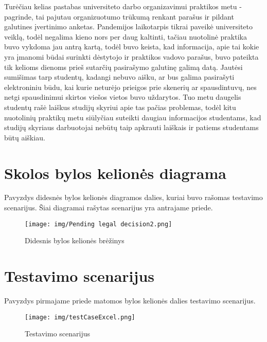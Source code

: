 \documentclass{VUMIFPSkursinis}
\begin{document}
Turėčiau kelias pastabas universiteto darbo organizavimui praktikos metu - pagrinde, tai pajutau organizuotumo trūkumą renkant parašus ir pildant galutines įvertinimo anketas. Pandemijos laikotarpis tikrai paveikė universiteto veiklą, todėl negalima kieno nors per daug kaltinti, tačiau nuotolinė praktika buvo vykdoma jau antrą kartą, todėl buvo keista, kad informacija, apie tai kokie yra įmanomi būdai surinkti dėstytojo ir praktikos vadovo parašus, buvo pateikta tik kelioms dienoms prieš sutarčių pasirašymo galutinę galimą datą. Jautėsi sumišimas tarp studentų, kadangi nebuvo aišku, ar bus galima pasirašyti elektroniniu būdu, kai kurie neturėjo prieigos prie skenerių ar spausdintuvų, nes netgi spausdinimui skirtos viešos vietos buvo uždarytos. Tuo metu daugelis studentų rašė laiškus studijų skyriui apie tas pačias problemas, todėl kitu nuotolinių praktikų metu siūlyčiau suteikti daugiau informacijos studentams, kad studijų skyriaus darbuotojai nebūtų taip apkrauti laiškais ir patiems studentams būtų aiškiau.

\printbibliography[heading=bibintoc]

\appendix
\section{Skolos bylos kelionės diagrama}
Pavyzdys didesnės bylos kelionės diagramos dalies, kuriai buvo rašomas testavimo scenarijus. Šiai diagramai rašytas scenarijus yra antrajame priede.

\begin{figure}[H]
    \centering
    \texttt{[image: img/Pending legal decision2.png]}
    \caption{Didesnis bylos kelionės brėžinys}
    \label{img:brezinysDid}
\end{figure}

\section{Testavimo scenarijus}
Pavyzdys pirmajame priede matomos bylos kelionės dalies testavimo scenarijus.

\begin{figure}[H]
    \centering
    \texttt{[image: img/testCaseExcel.png]}
    \caption{Testavimo scenarijus}
    \label{img:testScenarijus}
\end{figure}

\end{document}
